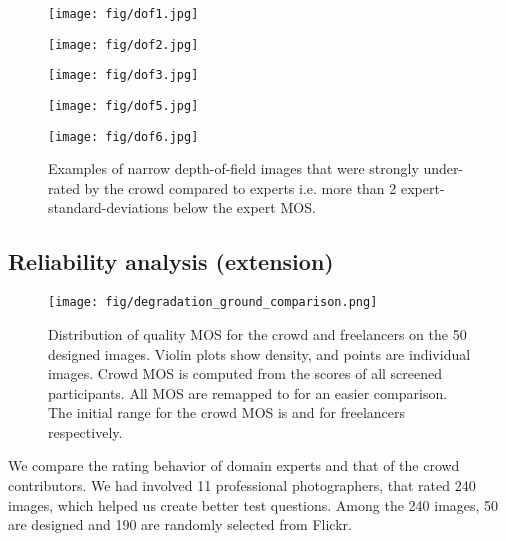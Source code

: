 \documentclass{article}
\begin{document}
\begin{figure*}[!ht]
\centering
\begin{minipage}{0.19\linewidth}
\centerline{\texttt{[image: fig/dof1.jpg]}}
\end{minipage}
\begin{minipage}{0.19\linewidth}
\centerline{\texttt{[image: fig/dof2.jpg]}}
\end{minipage}
\begin{minipage}{0.19\linewidth}
\centerline{\texttt{[image: fig/dof3.jpg]}}
\end{minipage}
\begin{minipage}{0.19\linewidth}
\centerline{\texttt{[image: fig/dof5.jpg]}}
\end{minipage}
\begin{minipage}{0.19\linewidth}
\centerline{\texttt{[image: fig/dof6.jpg]}}
\end{minipage}
\caption{Examples of narrow depth-of-field images that were strongly under-rated by the crowd compared to experts i.e. more than 2 expert-standard-deviations below the expert MOS.}
\label{fig:depth_of_field_images}
\end{figure*}



\subsection{Reliability analysis (extension)}
\label{sec:reliability_extension}

\begin{figure*}[!hb]
\centering
\texttt{[image: fig/degradation\_ground\_comparison.png]}
\caption{Distribution of quality MOS for the crowd and freelancers on the 50 designed images. Violin plots show density, and points are individual images. Crowd MOS is computed from the scores of all screened participants. All MOS are remapped to  for an easier comparison. The initial range for the crowd MOS is  and  for freelancers respectively.}
\label{fig:ground_comparison}
\end{figure*} 

We compare the rating behavior of domain experts and that of the crowd contributors. We had involved 11 professional photographers, that rated 240 images, which helped us create better test questions. Among the 240 images, 50 are designed and 190 are randomly selected from Flickr. 
\end{document}

